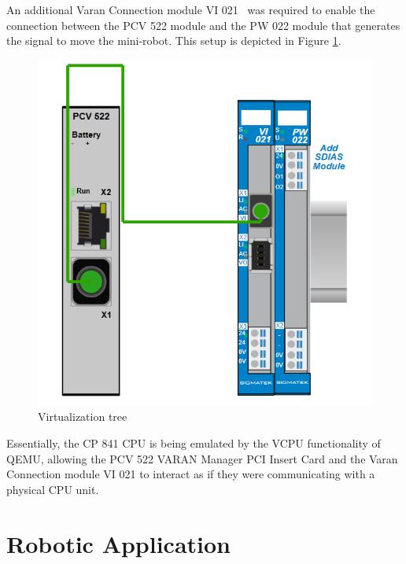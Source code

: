 \documentclass[MMR,Master,english]{twbook}
\begin{document}
\noindent An additional Varan Connection module VI 021~\cite{InterfacesSplittersSIGMATEK} was required to enable the connection between the PCV 522 module and the PW 022 module that generates the signal to move the mini-robot. This setup is depicted in Figure \ref{fig:virt_tree}.

\begin{figure}[H]
	\centering
	\includegraphics[width=0.5\columnwidth]{img/experiment/virt_tree.png}
	\caption[Virtualization tree]{Virtualization tree}
	\label{fig:virt_tree}
\end{figure}

\noindent Essentially, the CP 841 CPU is being emulated by the VCPU functionality of QEMU, allowing the PCV 522 VARAN Manager PCI Insert Card and the Varan Connection module VI 021 to interact as if they were communicating with a physical CPU unit.

\clearpage
\section{Robotic Application}

\clearpage
\end{document}
